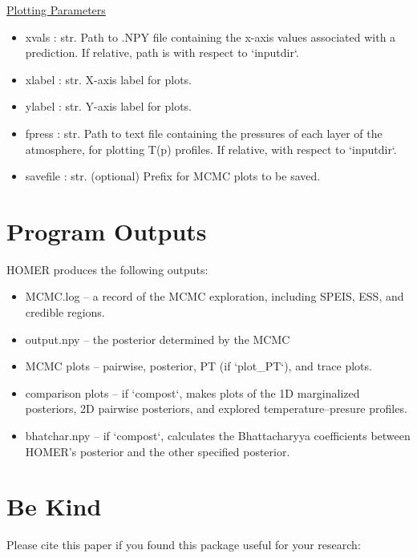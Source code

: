 \documentclass[letterpaper, 12pt]{article}
\begin{document}
\noindent \underline{Plotting Parameters}
\begin{itemize}
\item xvals      : str.  Path to .NPY file containing the x-axis values 
                         associated with a prediction.
                         If relative, path is with respect to `inputdir`.
\item xlabel     : str.  X-axis label for plots.
\item ylabel     : str.  Y-axis label for plots.
\item fpress     : str.  Path to text file containing the pressures of each 
                         layer of the atmosphere, for plotting T(p) profiles.
                         If relative, with respect to `inputdir`.
\item savefile   : str.  (optional) Prefix for MCMC plots to be saved.
\end{itemize}



\section{Program Outputs}
\label{sec:outputs}

HOMER produces the following outputs:

\begin{itemize}
\item MCMC.log -- a record of the MCMC exploration, including SPEIS, ESS, and 
                  credible regions.
\item output.npy -- the posterior determined by the MCMC
\item MCMC plots -- pairwise, posterior, PT (if `plot\_PT`), and trace plots.
\item comparison plots -- if `compost`, makes plots of the 1D marginalized 
                          posteriors, 2D pairwise posteriors, and explored 
                          temperature--presure profiles.
\item bhatchar.npy -- if `compost`, calculates the Bhattacharyya coefficients 
                      between HOMER's posterior and the other specified 
                      posterior.
\end{itemize}



\section{Be Kind}
\label{sec:bekind}
Please cite this paper if you found this package useful for your
research:
\end{document}
